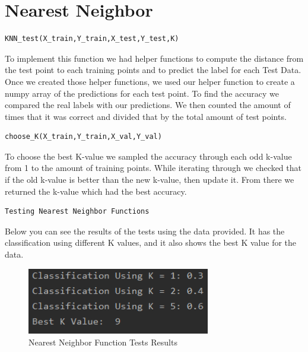 \documentclass[12pt,letterpaper]{article}
\begin{document}
\section*{Nearest Neighbor}
    
    \begin{lstlisting}[style = Python]
    KNN_test(X_train,Y_train,X_test,Y_test,K)
    \end{lstlisting}
    
    \begin{flushleft}To implement this function we had helper functions to compute the distance from the test point to each training points and to predict the label for each Test Data. Once we created those helper functions, we used our helper function to create a numpy array of the predictions for each test point. To find the accuracy we compared the real labels with our predictions. We then counted the amount of times that it was correct and divided that by the total amount of test points.
    \end{flushleft}
    
    
    \begin{lstlisting}[style = Python]
    choose_K(X_train,Y_train,X_val,Y_val)
    \end{lstlisting}
    
    \begin{flushleft}To choose the best K-value we sampled the accuracy through each odd k-value from 1 to the amount of training points. While iterating through we checked that if the old k-value is better than the new k-value, then update it. From there we returned the k-value which had the best accuracy.
    \end{flushleft}
    
    \begin{lstlisting}[style = Python]
    Testing Nearest Neighbor Functions
    \end{lstlisting}
    
    \begin{flushleft}Below you can see the results of the tests using the data provided. It has the classification using different K values, and it also shows the best K value for the data.
    \end{flushleft}
    
    \begin{figure}[htp]
        \centering
        \includegraphics[width=8cm]{knntest.PNG}
        \caption{Nearest Neighbor Function Tests Results}
        \label{fig:knntest}
    \end{figure}
    
\end{document}
